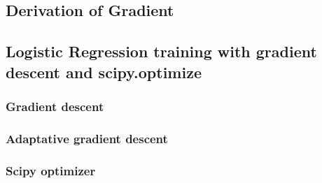 \documentclass[12pt,halfline,a4paper]{ouparticle}
\begin{document}
\subsection{Derivation of Gradient}

\subsection{Logistic Regression training with gradient descent and scipy.optimize}

\subsubsection{Gradient descent}

\subsubsection{Adaptative gradient descent}

\subsubsection{Scipy optimizer}
\end{document}
